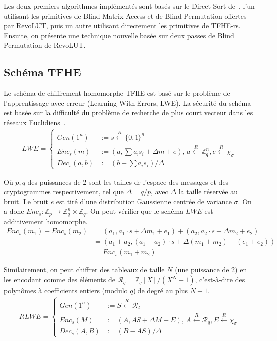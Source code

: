\documentclass{article}
\begin{document}
Les deux premiers algorithmes implémentés sont basés sur le Direct Sort de~\cite{lauter_depth_2015}, l'un utilisant les primitives de Blind Matrix Access et de Blind Permutation offertes par RevoLUT, puis un autre utilisant directement les primitives de TFHE-rs. Ensuite, on présente une technique nouvelle basée sur deux passes de Blind Permutation de RevoLUT.\@

\subsection{Schéma TFHE}

Le schéma de chiffrement homomorphe TFHE est basé sur le problème de l'apprentissage avec erreur (Learning With Errors, LWE). La sécurité du schéma est basée sur la difficulté du problème de recherche de plus court vecteur dans les réseaux Euclidiens~\cite{regev_lattices_2009}.
\begin{align*}
    LWE = \begin{cases}
        Gen(1^n) &:= s \overset{R}{\gets} {\{0, 1\}}^n \\
        Enc_s(m) &:= (a, \sum{a_i s_i} + \Delta m + e),\, a \overset{R}{\gets} \mathbb{Z}_q^n, e \overset{R}{\gets} \chi_\sigma \\
        Dec_s(a, b) &:= (b - \sum{a_i s_i})  / \Delta
    \end{cases}
\end{align*}

Où $p, q$ des puissances de 2 sont les tailles de l'espace des messages et des cryptogrammes respectivement, tel que $\Delta = q / p$, avec $\Delta$ la taille réservée au bruit. Le bruit $e$ est tiré d'une distribution Gaussienne centrée de variance $\sigma$. On a donc $Enc_s : \mathbb{Z}_p \to \mathbb{Z}_q^n \times \mathbb{Z}_q$. On peut vérifier que le schéma $LWE$ est additivement homomorphe.
\begin{align*}
    Enc_s(m_1) + Enc_s(m_2) & = (a_1, a_1 \cdot s + \Delta m_1 + e_1) + (a_2, a_2 \cdot s + \Delta m_2 + e_2) \\
    &= (a_1 + a_2, (a_1 + a_2) \cdot s + \Delta (m_1 + m_2) + (e_1 + e_2)) \\
    &= Enc_s(m_1 + m_2)
\end{align*}

Similairement, on peut chiffrer des tableaux de taille $N$ (une puissance de 2) en les encodant comme des éléments de $\mathcal{R}_q = \mathbb{Z}_q[X]/(X^N+1)$, c'est-à-dire des polynômes à coefficients entiers (modulo $q$) de degré au plus $N - 1$.
\begin{align*}
    RLWE = \begin{cases}
        Gen(1^n) &:= S \overset{R}{\gets} \mathcal{R}_2 \\
        Enc_s(M) &:= (A, AS + \Delta M + E),\, A \overset{R}{\gets} \mathcal{R}_q, E \overset{R}{\gets} \chi_\sigma \\
        Dec_s(A, B) &:= (B - AS) / \Delta
    \end{cases}
\end{align*}
\end{document}
